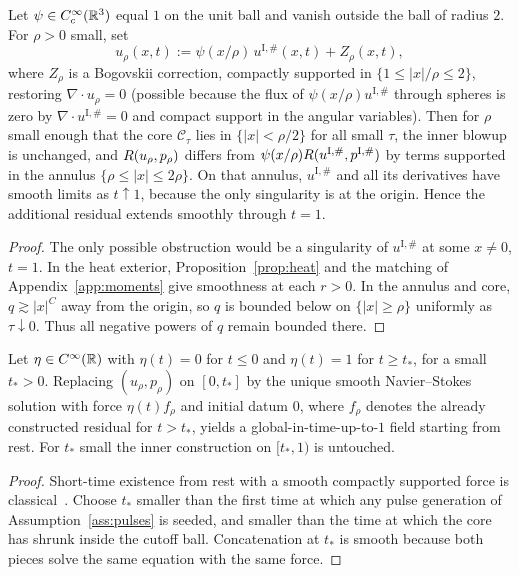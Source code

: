 \begin{lemma}
\label{lem:cutoff-space}
Let $\psi\in C_c^\infty(\mathbb{R}^3)$ equal $1$ on the unit ball and vanish outside the ball of radius $2$. For $\rho>0$ small, set
\[
u_\rho(x,t):=\psi(x/\rho)\,u^{\mathrm I,\#}(x,t)+Z_\rho(x,t),
\]
where $Z_\rho$ is a {B}ogovskii correction, compactly supported in $\{1\le |x|/\rho\le 2\}$, restoring $\nabla\cdot u_\rho=0$ (possible because the flux of $\psi(x/\rho)u^{\mathrm I,\#}$ through spheres is zero by $\nabla\cdot u^{\mathrm I,\#}=0$ and compact support in the angular variables). Then for $\rho$ small enough that the core $\mathcal C_\tau$ lies in $\{|x|<\rho/2\}$ for all small $\tau$, the inner blowup is unchanged, and $R(u_\rho,p_\rho)$ differs from $\psi(x/\rho)R(u^{\mathrm I,\#},p^{\mathrm I,\#})$ by terms supported in the annulus $\{\rho\le |x|\le 2\rho\}$. On that annulus, $u^{\mathrm I,\#}$ and all its derivatives have smooth limits as $t\uparrow 1$, because the only singularity is at the origin. Hence the additional residual extends smoothly through $t=1$.
\end{lemma}

\begin{proof}
The only possible obstruction would be a singularity of $u^{\mathrm I,\#}$ at some $x\neq 0$, $t=1$. In the heat exterior, Proposition~\ref{prop:heat} and the matching of Appendix~\ref{app:moments} give smoothness at each $r>0$. In the annulus and core, $q\gtrsim |x|^{C}$ away from the origin, so $q$ is bounded below on $\{|x|\ge\rho\}$ uniformly as $\tau\downarrow 0$. Thus all negative powers of $q$ remain bounded there.
\end{proof}

\begin{lemma}
\label{lem:turnon}
Let $\eta\in C^\infty(\mathbb{R})$ with $\eta(t)=0$ for $t\le 0$ and $\eta(t)=1$ for $t\ge t_*$, for a small $t_*>0$. Replacing $(u_\rho,p_\rho)$ on $[0,t_*]$ by the unique smooth {N}avier--{S}tokes solution with force $\eta(t) f_\rho$ and initial datum $0$, where $f_\rho$ denotes the already constructed residual for $t>t_*$, yields a global-in-time-up-to-$1$ field starting from rest. For $t_*$ small the inner construction on $[t_*,1)$ is untouched.
\end{lemma}

\begin{proof}
Short-time existence from rest with a smooth compactly supported force is classical~\cite{kato1972}. Choose $t_*$ smaller than the first time at which any pulse generation of Assumption~\ref{ass:pulses} is seeded, and smaller than the time at which the core has shrunk inside the cutoff ball. Concatenation at $t_*$ is smooth because both pieces solve the same equation with the same force.
\end{proof}

